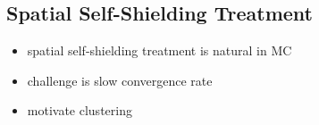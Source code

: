 \subsection{Spatial Self-Shielding Treatment}
\label{subsec:chap2-spatial-shield}

\begin{itemize}[noitemsep]
  \item spatial self-shielding treatment is natural in \ac{MC}
  \item challenge is slow convergence rate
  \item motivate clustering
\end{itemize}